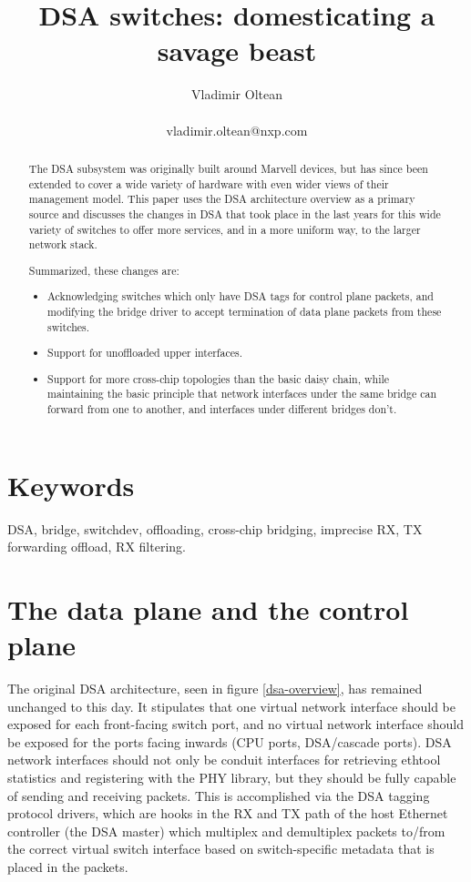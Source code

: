 \documentclass[letterpaper]{article}
\title{DSA switches: domesticating a savage beast}
\author{Vladimir Oltean\\
  \\vladimir.oltean@nxp.com\\
}
\begin{document}
\maketitle
\begin{abstract}

  The DSA subsystem was originally built around Marvell devices, but has since
  been extended to cover a wide variety of hardware with even wider views of
  their management model. This paper uses the DSA architecture overview
  \cite{dsa-netdev-2.1} as a primary source and discusses the changes in DSA
  that took place in the last years for this wide variety of switches to offer
  more services, and in a more uniform way, to the larger network stack.

  Summarized, these changes are:

\begin{itemize}
\item Acknowledging switches which only have DSA tags for control plane
      packets, and modifying the bridge driver to accept termination of data
      plane packets from these switches.
\item Support for unoffloaded upper interfaces.
\item Support for more cross-chip topologies than the basic daisy chain, while
      maintaining the basic principle that network interfaces under the same
      bridge can forward from one to another, and interfaces under different
      bridges don't.
\end{itemize}

\end{abstract}

\section{Keywords}

DSA, bridge, switchdev, offloading, cross-chip bridging, imprecise RX, TX
forwarding offload, RX filtering.

\section{The data plane and the control plane}

The original DSA architecture, seen in figure \ref{dsa-overview}, has remained
unchanged to this day. It stipulates that one virtual network interface should
be exposed for each front-facing switch port, and no virtual network interface
should be exposed for the ports facing inwards (CPU ports, DSA/cascade ports).
DSA network interfaces should not only be conduit interfaces for retrieving
ethtool statistics and registering with the PHY library, but they should be
fully capable of sending and receiving packets. This is accomplished via the
DSA tagging protocol drivers, which are hooks in the RX and TX path of the host
Ethernet controller (the DSA master) which multiplex and demultiplex packets
to/from the correct virtual switch interface based on switch-specific metadata
that is placed in the packets.
\end{document}
